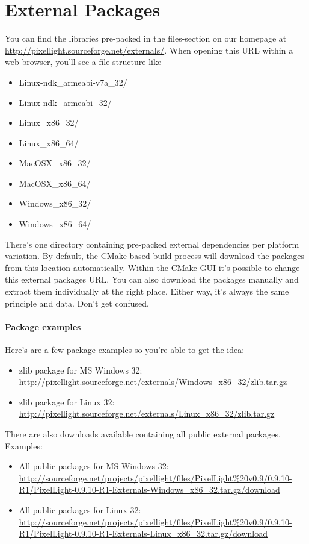 \section{External Packages}
You can find the libraries pre-packed in the files-section on our homepage at \url{http://pixellight.sourceforge.net/externals/}. When opening this \ac{URL} within a web browser, you'll see a file structure like
\begin{itemize}
\item{Linux-ndk\_armeabi-v7a\_32/}
\item{Linux-ndk\_armeabi\_32/}
\item{Linux\_x86\_32/}
\item{Linux\_x86\_64/}
\item{MacOSX\_x86\_32/}
\item{MacOSX\_x86\_64/}
\item{Windows\_x86\_32/}
\item{Windows\_x86\_64/}
\end{itemize}
There's one directory containing pre-packed external dependencies per platform variation. By default, the CMake based build process will download the packages from this location automatically. Within the CMake-GUI it's possible to change this external packages \ac{URL}. You can also download the packages manually and extract them individually at the right place. Either way, it's always the same principle and data. Don't get confused.


\paragraph{Package examples}
Here's are a few package examples so you're able to get the idea:
\begin{itemize}
\item{zlib package for \ac{MS} Windows \SI{32}{\bit}: \url{http://pixellight.sourceforge.net/externals/Windows_x86_32/zlib.tar.gz}}
\item{zlib package for Linux \SI{32}{\bit}: \url{http://pixellight.sourceforge.net/externals/Linux_x86_32/zlib.tar.gz}}
\end{itemize}

There are also downloads available containing all public external packages. Examples:
\begin{itemize}
\item{All public packages for \ac{MS} Windows \SI{32}{\bit}: \url{http://sourceforge.net/projects/pixellight/files/PixelLight%20v0.9/0.9.10-R1/PixelLight-0.9.10-R1-Externals-Windows_x86_32.tar.gz/download}}
\item{All public packages for Linux \SI{32}{\bit}: \url{http://sourceforge.net/projects/pixellight/files/PixelLight%20v0.9/0.9.10-R1/PixelLight-0.9.10-R1-Externals-Linux_x86_32.tar.gz/download}}
\end{itemize}


